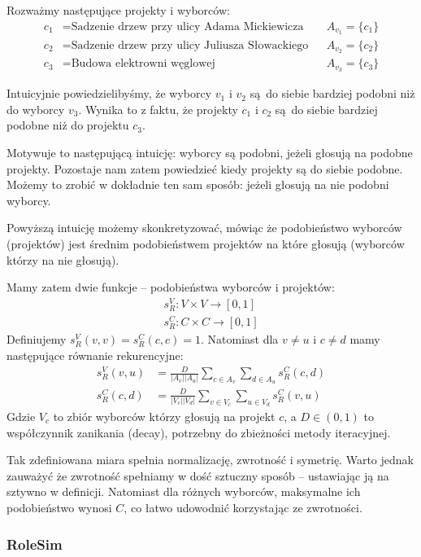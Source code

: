 \documentclass{article}
\begin{document}
Rozważmy następujące projekty i wyborców:
\begin{align*}
  c_1 &= \text{Sadzenie drzew przy ulicy Adama Mickiewicza} && A_{v_1} = \{c_1\} \\
  c_2 &= \text{Sadzenie drzew przy ulicy Juliusza Słowackiego} && A_{v_2} = \{c_2\} \\
  c_3 &= \text{Budowa elektrowni węglowej} && A_{v_3} = \{c_3\}
\end{align*}

Intuicyjnie powiedzielibyśmy, że wyborcy $v_1$ i $v_2$ są do siebie bardziej
podobni niż do wyborcy $v_3$. Wynika to z faktu, że projekty $c_1$ i $c_2$
są do siebie bardziej podobne niż do projektu $c_3$.

Motywuje to następującą intuicję: wyborcy są podobni, jeżeli głosują na podobne
projekty. Pozostaje nam zatem powiedzieć kiedy projekty są do siebie podobne.
Możemy to zrobić w dokładnie ten sam sposób: jeżeli głosują na nie podobni
wyborcy.

Powyższą intuicję możemy skonkretyzować, mówiąc że podobieństwo wyborców
(projektów) jest średnim podobieństwem projektów na które głosują (wyborców
którzy na nie głosują).

Mamy zatem dwie funkcje -- podobieństwa wyborców i projektów:
\begin{align*}
  s^V_R : V \times V \to [0, 1] \\
  s^C_R : C \times C \to [0, 1]
\end{align*}
Definiujemy $s^V_R(v,v)=s^C_R(c,c)=1$. Natomiast dla $v \neq u$ i $c \neq d$
mamy następujące równanie rekurencyjne:
\begin{align*}
  s^V_R(v, u) &= \frac{D}{|A_v| |A_u|} \sum_{c \in A_v} \sum_{d \in A_u} s^C_R(c, d) \\
  s^C_R(c, d) &= \frac{D}{|V_c| |V_d|} \sum_{v \in V_c} \sum_{u \in V_d} s^C_R(v, u)
\end{align*}
Gdzie $V_c$ to zbiór wyborców którzy głosują na projekt $c$, a $D \in (0, 1)$
to współczynnik zanikania (decay), potrzebny do zbieżności metody iteracyjnej.

Tak zdefiniowana miara spełnia normalizację, zwrotność i symetrię. Warto
jednak zauważyć że zwrotność spełniamy w dość sztuczny sposób -- ustawiając
ją na sztywno w definicji. Natomiast dla różnych wyborców, maksymalne ich
podobieństwo wynosi $C$, co łatwo udowodnić korzystając ze zwrotności.


\subsubsection{RoleSim}
\end{document}
